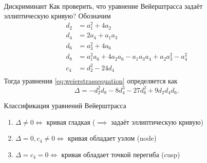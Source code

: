 \documentclass{beamer}
\begin{document}
\begin{frame}{Дискриминант}
    Как проверить, что уравнение Вейерштрасса задаёт эллиптическую кривую? Обозначим
    \begin{equation}
        \begin{split}
            d_2 &= a_1^2 + 4a_2 \\
            d_4 &= 2a_4 + a_1a_3 \\
            d_6 &= a_3^2 + 4a_6 \\
            d_8 &= a_1^2a_6 + 4a_2a_6 - a_1a_3a_4 + a_2a_3^2 - a_4^2 \\
            c_4 &= d_2^2 - 24d_4 \\
        \end{split}
    \end{equation}
    Тогда  уравнения \eqref{eq:weierstrassequation} определяется как 
    \[
    \Delta = -d_2^2d_8 - 8d_4^3-27d_6^2+9d_2d_4d_6.
    \]
\end{frame}


\begin{frame}{Классификация уравнений Вейерштрасса}
    \begin{tcolorbox}[colframe=title-and-section-color!120, colback=title-and-section-color!5, title=Теорема \text{[Silverman, Thm. 1.4]}, center title]
        \begin{enumerate}
            \item $\Delta \neq 0 \iff$ кривая гладкая ($\implies$ задаёт эллиптическую кривую) 
            \item $\Delta = 0, c_4 \neq 0 \iff$ кривая обладает узлом (node) 
            \item $\Delta = c_4 = 0 \iff$ кривая обладает точкой перегиба (cusp)
        \end{enumerate}
    \end{tcolorbox}
\end{frame}
\end{document}
